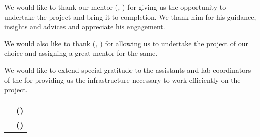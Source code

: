 
We would like to thank our mentor \textbf{\mentorName{}}
(\textit{\mentorJobTitle{}, \departmentName{}}) for giving us the opportunity
to undertake the project and bring it to completion. We thank him for his
guidance, insights and advices and appreciate his engagement.

We would also like to thank \textbf{\headOfDeptName{}}
(\textit{\headOfDeptJobTitle{}, \departmentName{}}) for allowing us to
undertake the project of our choice and assigning a great mentor for the same.

We would like to extend special gratitude to the assistants and lab
coordinators of the \departmentName{} for providing us the infrastructure
necessary to work efficiently on the project.

\null\vfill

\begin{center}
    \begin{tabularx}{\textwidth}{L R}
        & \textbf{\authorAshhar{} (\authorAshharRoll{})}\\
        & \textbf{\authorAdeela{} (\authorAdeelaRoll{})}\\
    \end{tabularx}
\end{center}

